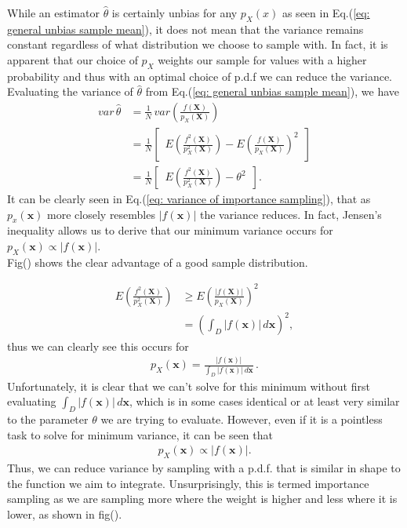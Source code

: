 \documentclass{article}
\begin{document}
While an estimator $\hat{\theta}$ is certainly unbias for any $p_X(x)$ as seen in 
Eq.(\ref{eq: general unbias sample mean}), it does not mean that the variance remains constant
regardless of what distribution we choose to sample with. 
In fact, it is apparent that our choice of $p_X$ weights our sample for values with a higher 
probability and thus with an optimal choice of p.d.f we can reduce the variance.
\\
Evaluating the variance of $\hat{\theta}$ from Eq.(\ref{eq: general unbias sample mean}), we have
\begin{align}
    var\,\hat{\theta} &= \frac{1}{N}\, var \left( \frac{f(\boldsymbol{X})}{p_X(\boldsymbol{X})} \right) \\
    &=\frac{1}{N} \left[ \,\,\, E \left( \frac{f^{2}(\boldsymbol{X})}{p_{X}^{2}(\boldsymbol{X})} 
    \right) - E\left( \frac{f(\boldsymbol{X})}{p_{X}(\boldsymbol{X})} \right)^{2} \,\,\, \right]\\
    &=\frac{1}{N} \left[ \,\,\, E \left( \frac{f^{2}(\boldsymbol{X})}{p_{X}^{2}(\boldsymbol{X})} 
    \right) - \theta^{2}\,\,\, \right].\label{eq: variance of importance sampling}
\end{align}
It can be clearly seen in Eq.(\ref{eq: variance of importance sampling}), that as $p_x(\boldsymbol{x})$
more closely resembles $|f(\boldsymbol{x})|$ the variance reduces. 
In fact, Jensen's inequality \cite{gentle2003random} allows us to derive that our minimum variance occurs for 
$p_X(\boldsymbol{x}) \propto |f(\boldsymbol{x})|$.
\\
Fig() shows the clear advantage of a good sample distribution. 


\begin{align}
    E \left( \frac{f^2(\boldsymbol{X})}{p_{X}^{2}(\boldsymbol{X})} \right)
    &\geq 
    E \left( \frac{|f(\boldsymbol{X})|}{p_{X}(\boldsymbol{X})} \right)^2\\
    & = \left( \int_{D} |f(\boldsymbol{x})| \, d\boldsymbol{x} \right)^2,
\end{align}
thus we can clearly see this occurs for
\begin{align}
    p_X(\boldsymbol{x}) = \frac{|f(\boldsymbol{x})|}{\int_{D} |f(\boldsymbol{x})|\,d\boldsymbol{x}}\,.
\end{align}
Unfortunately, it is clear that we can't solve for this minimum without first evaluating 
$\int_{D}|f(\boldsymbol{x})|\,d\boldsymbol{x}$, which is in some cases identical 
or at least very similar to the parameter $\theta$ we are trying to evaluate. However, even if 
it is a pointless task to solve for minimum variance, it can be seen that 
\begin{align}
    p_X(\boldsymbol{x}) \propto |f(\boldsymbol{x})| .
\end{align}
Thus, we can reduce variance by sampling with a p.d.f. that is similar in shape to the function we 
aim to integrate. 
Unsurprisingly, this is termed importance sampling as we are sampling more where 
the weight is higher and less where it is lower, as shown in fig(). 
\end{document}
